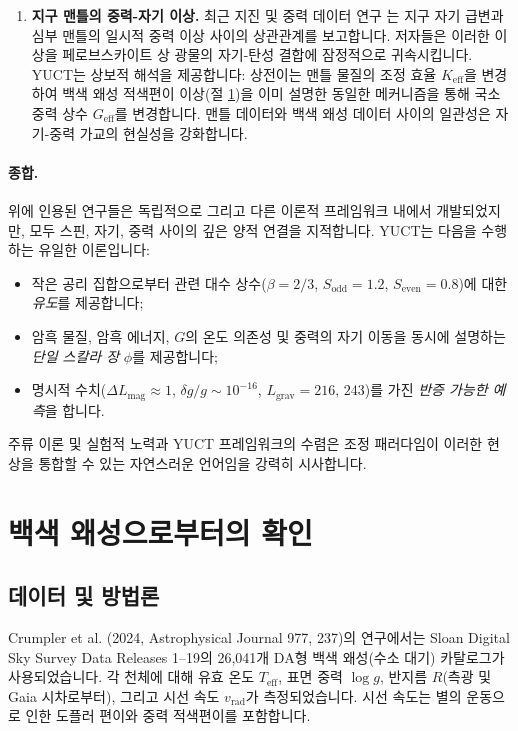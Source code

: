 \documentclass[11pt,a4paper]{article}
\begin{document}
\begin{enumerate}
		\item \textbf{지구 맨틀의 중력-자기 이상.} 최근 지진 및 중력 데이터 연구 \cite{MantleGM2025}는 지구 자기 급변과 심부 맨틀의 일시적 중력 이상 사이의 상관관계를 보고합니다. 저자들은 이러한 이상을 페로브스카이트 상 광물의 자기-탄성 결합에 잠정적으로 귀속시킵니다. YUCT는 상보적 해석을 제공합니다: 상전이는 맨틀 물질의 조정 효율 $K_{\mathrm{eff}}$을 변경하여 백색 왜성 적색편이 이상(절 \ref{sec:wd})을 이미 설명한 동일한 메커니즘을 통해 국소 중력 상수 $G_{\mathrm{eff}}$를 변경합니다. 맨틀 데이터와 백색 왜성 데이터 사이의 일관성은 자기-중력 가교의 현실성을 강화합니다.
		
	\end{enumerate}
	
	\paragraph{종합.}
	위에 인용된 연구들은 독립적으로 그리고 다른 이론적 프레임워크 내에서 개발되었지만, 모두 스핀, 자기, 중력 사이의 깊은 양적 연결을 지적합니다. YUCT는 다음을 수행하는 유일한 이론입니다:
	\begin{itemize}
		\item 작은 공리 집합으로부터 관련 대수 상수($\beta = 2/3$, $S_{\mathrm{odd}} = 1.2$, $S_{\mathrm{even}} = 0.8$)에 대한 \emph{유도}를 제공합니다;
		\item 암흑 물질, 암흑 에너지, $G$의 온도 의존성 및 중력의 자기 이동을 동시에 설명하는 \emph{단일 스칼라 장} $\phi$를 제공합니다;
		\item 명시적 수치($\Delta L_{\mathrm{mag}} \approx 1$, $\delta g/g \sim 10^{-16}$, $L_{\mathrm{grav}} = 216,\,243$)를 가진 \emph{반증 가능한 예측}을 합니다.
	\end{itemize}
	주류 이론 및 실험적 노력과 YUCT 프레임워크의 수렴은 조정 패러다임이 이러한 현상을 통합할 수 있는 자연스러운 언어임을 강력히 시사합니다.
	
	\section{백색 왜성으로부터의 확인}
	\label{sec:wd}
	
	\subsection{데이터 및 방법론}
	\label{subsec:wd-data}
	
	Crumpler et al. (2024, Astrophysical Journal 977, 237)의 연구에서는 Sloan Digital Sky Survey Data Releases 1–19의 26,041개 DA형 백색 왜성(수소 대기) 카탈로그가 사용되었습니다. 각 천체에 대해 유효 온도 $T_{\text{eff}}$, 표면 중력 $\log g$, 반지름 $R$(측광 및 Gaia 시차로부터), 그리고 시선 속도 $v_{\text{rad}}$가 측정되었습니다. 시선 속도는 별의 운동으로 인한 도플러 편이와 중력 적색편이를 포함합니다.
	
\end{document}
